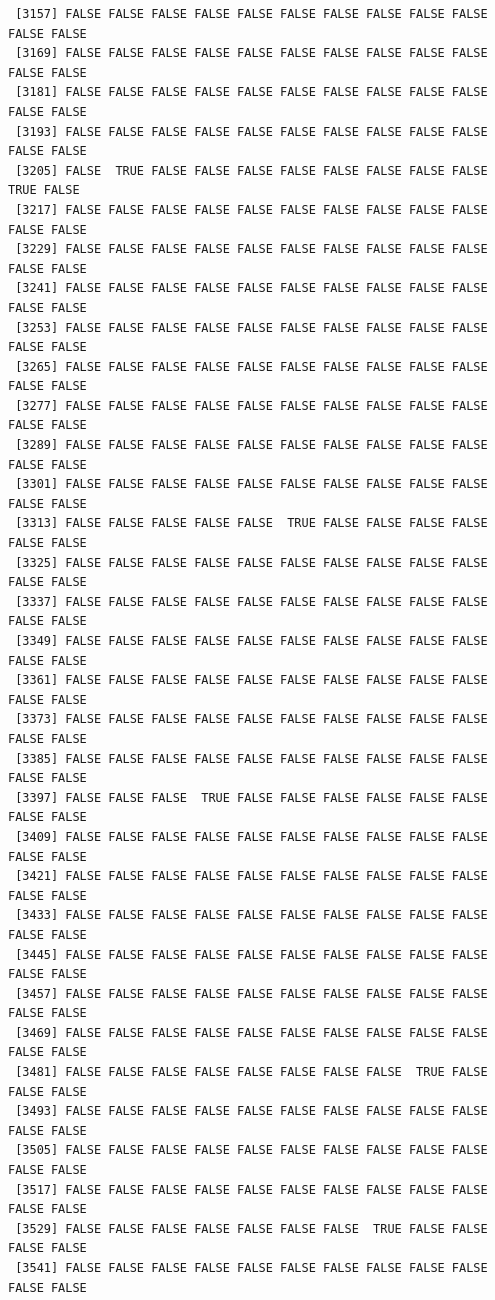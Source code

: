 \documentclass[
  a4paper,
  DIV=11,
  numbers=noendperiod]{scrartcl}
\begin{document}
\begin{verbatim}
 [3157] FALSE FALSE FALSE FALSE FALSE FALSE FALSE FALSE FALSE FALSE FALSE FALSE
 [3169] FALSE FALSE FALSE FALSE FALSE FALSE FALSE FALSE FALSE FALSE FALSE FALSE
 [3181] FALSE FALSE FALSE FALSE FALSE FALSE FALSE FALSE FALSE FALSE FALSE FALSE
 [3193] FALSE FALSE FALSE FALSE FALSE FALSE FALSE FALSE FALSE FALSE FALSE FALSE
 [3205] FALSE  TRUE FALSE FALSE FALSE FALSE FALSE FALSE FALSE FALSE  TRUE FALSE
 [3217] FALSE FALSE FALSE FALSE FALSE FALSE FALSE FALSE FALSE FALSE FALSE FALSE
 [3229] FALSE FALSE FALSE FALSE FALSE FALSE FALSE FALSE FALSE FALSE FALSE FALSE
 [3241] FALSE FALSE FALSE FALSE FALSE FALSE FALSE FALSE FALSE FALSE FALSE FALSE
 [3253] FALSE FALSE FALSE FALSE FALSE FALSE FALSE FALSE FALSE FALSE FALSE FALSE
 [3265] FALSE FALSE FALSE FALSE FALSE FALSE FALSE FALSE FALSE FALSE FALSE FALSE
 [3277] FALSE FALSE FALSE FALSE FALSE FALSE FALSE FALSE FALSE FALSE FALSE FALSE
 [3289] FALSE FALSE FALSE FALSE FALSE FALSE FALSE FALSE FALSE FALSE FALSE FALSE
 [3301] FALSE FALSE FALSE FALSE FALSE FALSE FALSE FALSE FALSE FALSE FALSE FALSE
 [3313] FALSE FALSE FALSE FALSE FALSE  TRUE FALSE FALSE FALSE FALSE FALSE FALSE
 [3325] FALSE FALSE FALSE FALSE FALSE FALSE FALSE FALSE FALSE FALSE FALSE FALSE
 [3337] FALSE FALSE FALSE FALSE FALSE FALSE FALSE FALSE FALSE FALSE FALSE FALSE
 [3349] FALSE FALSE FALSE FALSE FALSE FALSE FALSE FALSE FALSE FALSE FALSE FALSE
 [3361] FALSE FALSE FALSE FALSE FALSE FALSE FALSE FALSE FALSE FALSE FALSE FALSE
 [3373] FALSE FALSE FALSE FALSE FALSE FALSE FALSE FALSE FALSE FALSE FALSE FALSE
 [3385] FALSE FALSE FALSE FALSE FALSE FALSE FALSE FALSE FALSE FALSE FALSE FALSE
 [3397] FALSE FALSE FALSE  TRUE FALSE FALSE FALSE FALSE FALSE FALSE FALSE FALSE
 [3409] FALSE FALSE FALSE FALSE FALSE FALSE FALSE FALSE FALSE FALSE FALSE FALSE
 [3421] FALSE FALSE FALSE FALSE FALSE FALSE FALSE FALSE FALSE FALSE FALSE FALSE
 [3433] FALSE FALSE FALSE FALSE FALSE FALSE FALSE FALSE FALSE FALSE FALSE FALSE
 [3445] FALSE FALSE FALSE FALSE FALSE FALSE FALSE FALSE FALSE FALSE FALSE FALSE
 [3457] FALSE FALSE FALSE FALSE FALSE FALSE FALSE FALSE FALSE FALSE FALSE FALSE
 [3469] FALSE FALSE FALSE FALSE FALSE FALSE FALSE FALSE FALSE FALSE FALSE FALSE
 [3481] FALSE FALSE FALSE FALSE FALSE FALSE FALSE FALSE  TRUE FALSE FALSE FALSE
 [3493] FALSE FALSE FALSE FALSE FALSE FALSE FALSE FALSE FALSE FALSE FALSE FALSE
 [3505] FALSE FALSE FALSE FALSE FALSE FALSE FALSE FALSE FALSE FALSE FALSE FALSE
 [3517] FALSE FALSE FALSE FALSE FALSE FALSE FALSE FALSE FALSE FALSE FALSE FALSE
 [3529] FALSE FALSE FALSE FALSE FALSE FALSE FALSE  TRUE FALSE FALSE FALSE FALSE
 [3541] FALSE FALSE FALSE FALSE FALSE FALSE FALSE FALSE FALSE FALSE FALSE FALSE

\end{verbatim}
\end{document}
